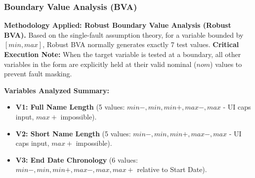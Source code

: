 \documentclass[twoside,final]{hcmut-report}
\begin{document}
\subsubsection{Boundary Value Analysis (BVA)}
\textbf{Methodology Applied: Robust Boundary Value Analysis (Robust BVA).} 
Based on the single-fault assumption theory, for a variable bounded by $[min, max]$, Robust BVA normally generates exactly 7 test values. \textbf{Critical Execution Note:} When the target variable is tested at a boundary, all other variables in the form are explicitly held at their valid nominal ($nom$) values to prevent fault masking.

\textbf{Variables Analyzed Summary:}
\begin{itemize}
    \item \textbf{V1: Full Name Length} (5 values: $min-, min, min+, max-, max$ - UI caps input, $max+$ impossible).
    \item \textbf{V2: Short Name Length} (5 values: $min-, min, min+, max-, max$ - UI caps input, $max+$ impossible).
    \item \textbf{V3: End Date Chronology} (6 values: $min-, min, min+, max-, max, max+$ relative to Start Date).
\end{itemize}
\end{document}
